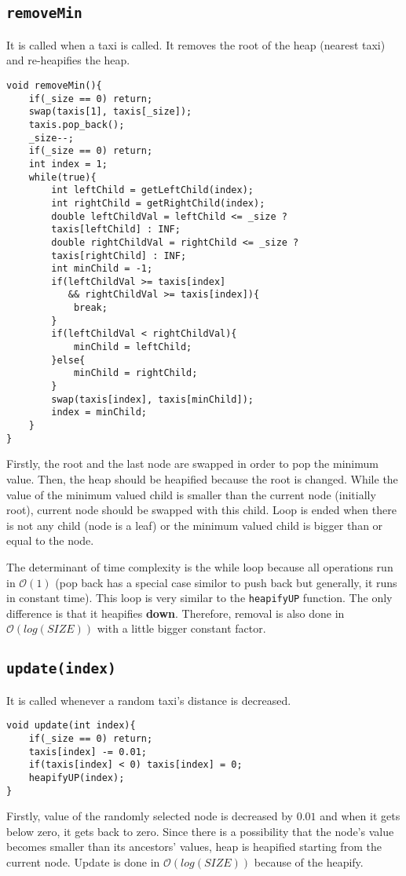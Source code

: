\documentclass[12pt, a4paper]{article}
\begin{document}
\subsection{\texttt{removeMin}}
\noindent It is called when a taxi is called. It removes the root of the heap (nearest taxi) and re-heapifies the heap.
\begin{lstlisting}
void removeMin(){
    if(_size == 0) return;
    swap(taxis[1], taxis[_size]);
    taxis.pop_back();
    _size--;
    if(_size == 0) return;
    int index = 1;
    while(true){
        int leftChild = getLeftChild(index);
        int rightChild = getRightChild(index);
        double leftChildVal = leftChild <= _size ?
        taxis[leftChild] : INF;
        double rightChildVal = rightChild <= _size ? 
        taxis[rightChild] : INF;
        int minChild = -1;
        if(leftChildVal >= taxis[index] 
           && rightChildVal >= taxis[index]){
            break; 
        }
        if(leftChildVal < rightChildVal){
            minChild = leftChild;
        }else{
            minChild = rightChild;
        }
        swap(taxis[index], taxis[minChild]); 
        index = minChild;
    }
}
\end{lstlisting}
Firstly, the root and the last node are swapped in order to pop the minimum value. Then, the heap should be heapified because the root is changed. While the value of the minimum valued child is smaller than the current node (initially root), current node should be swapped with this child. Loop is ended when there is not any child (node is a leaf) or the minimum valued child is bigger than or equal to the node.

\noindent The determinant of time complexity is the while loop because all operations run in $\mathcal{O}(1)$ (pop back has a special case similor to push back but generally, it runs in constant time). This loop is very similar to the \texttt{heapifyUP} function. The only difference is that it heapifies \textbf{down}. Therefore, removal is also done in $\mathcal{O}(log(SIZE))$ with a little bigger constant factor.
\subsection{\texttt{update(index)}}
\noindent It is called whenever a random taxi's distance is decreased.
\begin{lstlisting}
void update(int index){
    if(_size == 0) return;
    taxis[index] -= 0.01;
    if(taxis[index] < 0) taxis[index] = 0;
    heapifyUP(index);
}
\end{lstlisting}
Firstly, value of the randomly selected node is decreased by $0.01$ and when it gets below zero, it gets back to zero. Since there is a possibility that the node's value becomes smaller than its ancestors' values, heap is heapified starting from the current node. Update is done in $\mathcal{O}(log(SIZE))$ because of the heapify.
\end{document}

